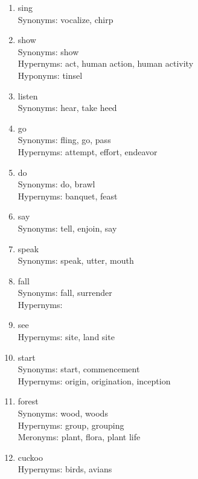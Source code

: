 \documentclass{article}
\begin{document}
\begin{enumerate}

\item sing \\
Synonyms:  vocalize, chirp

\item show \\
Synonyms:  show \\
Hypernyms: act,  human action,  human activity \\
Hyponyms: tinsel

\item listen \\
Synonyms:  hear,  take heed

\item go \\
Synonyms:  fling,  go,  pass \\
Hypernyms: attempt,  effort,  endeavor

\item do \\
Synonyms:  do,  brawl \\
Hypernyms: banquet,  feast

\item say \\
Synonyms:  tell,  enjoin,  say

\item speak \\
Synonyms:  speak,  utter,  mouth

\item fall \\
Synonyms:  fall,  surrender \\
Hypernyms: 

\item see \\
Hypernyms: site,  land site

\item start \\
Synonyms:  start,  commencement \\
Hypernyms: origin,  origination,  inception

\item forest \\
Synonyms:  wood,  woods \\
Hypernyms: group,  grouping \\
Meronyms: plant,  flora,  plant life

\item cuckoo \\
Hypernyms: birds, avians


\end{enumerate}
\end{document}
